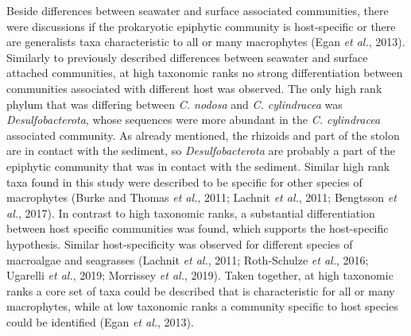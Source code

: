 \documentclass[12pt,]{article}
\begin{document}
Beside differences between seawater and surface associated communities,
there were discussions if the prokaryotic epiphytic community is
host-specific or there are generalists taxa characteristic to all or
many macrophytes (Egan \emph{et al.}, 2013). Similarly to previously
described differences between seawater and surface attached communities,
at high taxonomic ranks no strong differentiation between communities
associated with different host was observed. The only high rank phylum
that was differing between \emph{C. nodosa} and \emph{C. cylindracea}
was \emph{Desulfobacterota}, whose sequences were more abundant in the
\emph{C. cylindracea} associated community. As already mentioned, the
rhizoids and part of the stolon are in contact with the sediment, so
\emph{Desulfobacterota} are probably a part of the epiphytic community
that was in contact with the sediment. Similar high rank taxa found in
this study were described to be specific for other species of
macrophytes (Burke and Thomas \emph{et al.}, 2011; Lachnit \emph{et
al.}, 2011; Bengtsson \emph{et al.}, 2017). In contrast to high
taxonomic ranks, a substantial differentiation between host specific
communities was found, which supports the host-specific hypothesis.
Similar host-specificity was observed for different species of
macroalgae and seagrasses (Lachnit \emph{et al.}, 2011; Roth-Schulze
\emph{et al.}, 2016; Ugarelli \emph{et al.}, 2019; Morrissey \emph{et
al.}, 2019). Taken together, at high taxonomic ranks a core set of taxa
could be described that is characteristic for all or many macrophytes,
while at low taxonomic ranks a community specific to host species could
be identified (Egan \emph{et al.}, 2013).
\end{document}
